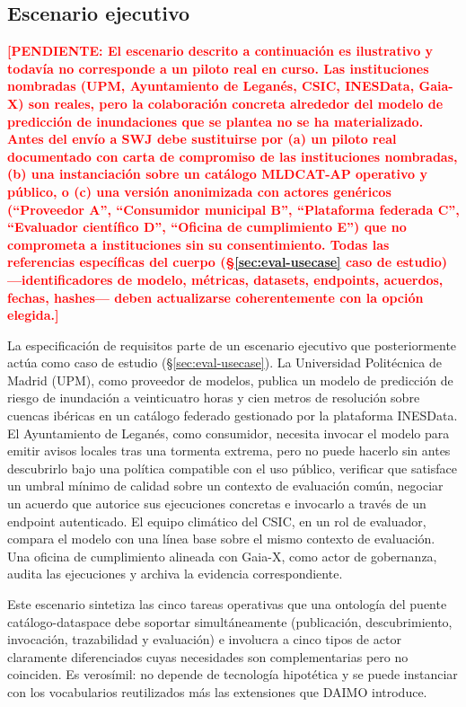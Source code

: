 \documentclass[11pt,a4paper]{article}
\newcommand{\TODO}[1]{\textcolor{red}{\textbf{[PENDIENTE: #1]}}}
\begin{document}
\subsection{Escenario ejecutivo}\label{sec:scenario}

\TODO{El escenario descrito a continuación es ilustrativo y todavía no corresponde a un piloto real en curso. Las instituciones nombradas (UPM, Ayuntamiento de Leganés, CSIC, INESData, Gaia-X) son reales, pero la colaboración concreta alrededor del modelo de predicción de inundaciones que se plantea no se ha materializado. Antes del envío a SWJ debe sustituirse por (a) un piloto real documentado con carta de compromiso de las instituciones nombradas, (b) una instanciación sobre un catálogo MLDCAT-AP operativo y público, o (c) una versión anonimizada con actores genéricos (``Proveedor A'', ``Consumidor municipal B'', ``Plataforma federada C'', ``Evaluador científico D'', ``Oficina de cumplimiento E'') que no comprometa a instituciones sin su consentimiento. Todas las referencias específicas del cuerpo (§\ref{sec:eval-usecase} caso de estudio) ---identificadores de modelo, métricas, datasets, endpoints, acuerdos, fechas, hashes--- deben actualizarse coherentemente con la opción elegida.}

La especificación de requisitos parte de un escenario ejecutivo que posteriormente actúa como caso de estudio (§\ref{sec:eval-usecase}). La Universidad Politécnica de Madrid (UPM), como proveedor de modelos, publica un modelo de predicción de riesgo de inundación a veinticuatro horas y cien metros de resolución sobre cuencas ibéricas en un catálogo federado gestionado por la plataforma INESData. El Ayuntamiento de Leganés, como consumidor, necesita invocar el modelo para emitir avisos locales tras una tormenta extrema, pero no puede hacerlo sin antes descubrirlo bajo una política compatible con el uso público, verificar que satisface un umbral mínimo de calidad sobre un contexto de evaluación común, negociar un acuerdo que autorice sus ejecuciones concretas e invocarlo a través de un endpoint autenticado. El equipo climático del CSIC, en un rol de evaluador, compara el modelo con una línea base sobre el mismo contexto de evaluación. Una oficina de cumplimiento alineada con Gaia-X, como actor de gobernanza, audita las ejecuciones y archiva la evidencia correspondiente.

Este escenario sintetiza las cinco tareas operativas que una ontología del puente catálogo-dataspace debe soportar simultáneamente (publicación, descubrimiento, invocación, trazabilidad y evaluación) e involucra a cinco tipos de actor claramente diferenciados cuyas necesidades son complementarias pero no coinciden. Es verosímil: no depende de tecnología hipotética y se puede instanciar con los vocabularios reutilizados más las extensiones que DAIMO introduce.
\end{document}

